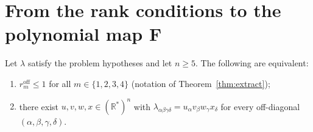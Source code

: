 \section{From the rank conditions to the polynomial map $\mathbf F$}

\begin{lemma}\label{lem:offrank1}
Let $\lambda$ satisfy the problem hypotheses and let $n\ge5$. The following are
equivalent:
\begin{enumerate}
\item[(a)] $r_m^{\mathrm{off}}\le1$ for all $m\in\{1,2,3,4\}$
(notation of Theorem~\ref{thm:extract});
\item[(b)] there exist $u,v,w,x\in(\mathbb R^*)^n$ with
$\lambda_{\alpha\beta\gamma\delta}=u_\alpha v_\beta w_\gamma x_\delta$ for every
off-diagonal $(\alpha,\beta,\gamma,\delta)$.
\end{enumerate}
\end{lemma}

